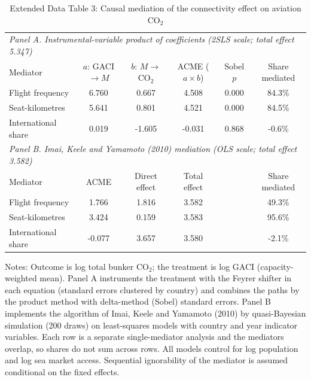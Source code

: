 \begin{table}[htbp]
\centering
\begin{threeparttable}
\caption{Extended Data Table 3: Causal mediation of the connectivity effect on aviation CO$_2$}
\label{tab:mediation}
\footnotesize
\begin{tabular}{lccccc}
\toprule
\multicolumn{6}{l}{\textit{Panel A. Instrumental-variable product of coefficients (2SLS scale; total effect 5.347)}} \\
Mediator & $a$: GACI$\rightarrow M$ & $b$: $M\rightarrow$CO$_2$ & ACME ($a\times b$) & Sobel $p$ & Share mediated \\
\midrule
  Flight frequency & 6.760 & 0.667 & 4.508 & 0.000 & 84.3\% \\
  Seat-kilometres & 5.641 & 0.801 & 4.521 & 0.000 & 84.5\% \\
  International share & 0.019 & -1.605 & -0.031 & 0.868 & -0.6\% \\
\midrule
\multicolumn{6}{l}{\textit{Panel B. Imai, Keele and Yamamoto (2010) mediation (OLS scale; total effect 3.582)}} \\
Mediator & ACME & Direct effect & Total effect & & Share mediated \\
\midrule
  Flight frequency & 1.766 & 1.816 & 3.582 & & 49.3\% \\
  Seat-kilometres & 3.424 & 0.159 & 3.583 & & 95.6\% \\
  International share & -0.077 & 3.657 & 3.580 & & -2.1\% \\
\bottomrule
\end{tabular}
\begin{tablenotes}[flushleft]
\footnotesize
\item Notes: Outcome is log total bunker CO$_2$; the treatment is log GACI (capacity-weighted mean). Panel A instruments the treatment with the Feyrer shifter in each equation (standard errors clustered by country) and combines the paths by the product method with delta-method (Sobel) standard errors. Panel B implements the algorithm of Imai, Keele and Yamamoto (2010) by quasi-Bayesian simulation (200 draws) on least-squares models with country and year indicator variables. Each row is a separate single-mediator analysis and the mediators overlap, so shares do not sum across rows. All models control for log population and log sea market access. Sequential ignorability of the mediator is assumed conditional on the fixed effects.
\end{tablenotes}
\end{threeparttable}
\end{table}
